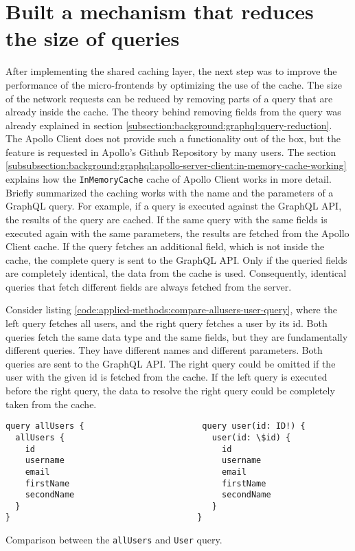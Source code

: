\section{Built a mechanism that reduces the size of queries}\label{section:applied-methods:query-reduction}

After implementing the shared caching layer, the next step was to improve the performance of the micro-frontends by optimizing the use of the cache. The size of the network requests can be reduced by removing parts of a query that are already inside the cache. The theory behind removing fields from the query was already explained in section \ref{subsection:background:graphql:query-reduction}. The Apollo Client does not provide such a functionality out of the box, but the feature is requested in Apollo's Github Repository by many users. The section \ref{subsubsection:background:graphql:apollo-server-client:in-memory-cache-working} explains how the \texttt{InMemoryCache} cache of Apollo Client works in more detail. Briefly summarized the caching works with the name and the parameters of a GraphQL query. For example, if a query is executed against the GraphQL \ac{API}, the results of the query are cached. If the same query with the same fields is executed again with the same parameters, the results are fetched from the Apollo Client cache. If the query fetches an additional field, which is not inside the cache, the complete query is sent to the GraphQL \ac{API}. Only if the queried fields are completely identical, the data from the cache is used. Consequently, identical queries that fetch different fields are always fetched from the server.

\bigskip

\noindent Consider listing \ref{code:applied-methods:compare-allusers-user-query}, where the left query fetches all users, and the right query fetches a user by its id. Both queries fetch the same data type and the same fields, but they are fundamentally different queries. They have different names and different parameters. Both queries are sent to the GraphQL \ac{API}. The right query could be omitted if the user with the given id is fetched from the cache. If the left query is executed before the right query, the data to resolve the right query could be completely taken from the cache.

\ifshowListings
\begin{listing}[H]
\begin{verbatim}
query allUsers {                        query user(id: ID!) {
  allUsers {                              user(id: \$id) {
    id                                      id
    username                                username
    email                                   email
    firstName                               firstName
    secondName                              secondName
  }                                       }
}                                      }
\end{verbatim}
\caption{Comparison between the \texttt{allUsers} and \texttt{User} query.}\label{code:applied-methods:compare-allusers-user-query}
\end{listing}
\fi

